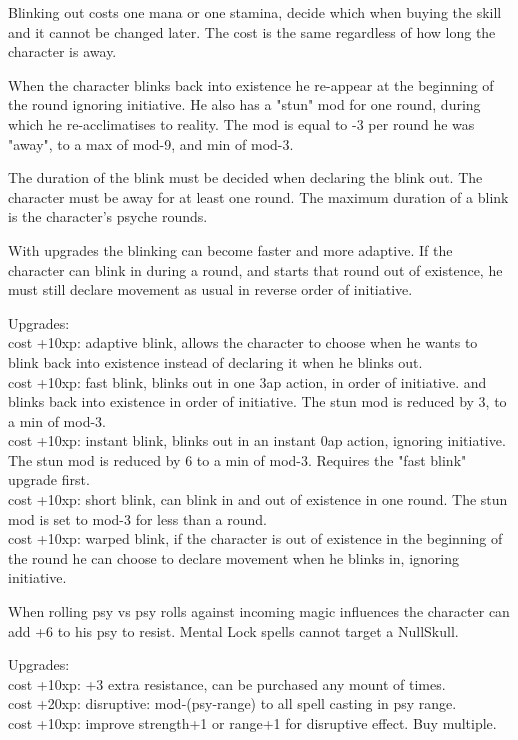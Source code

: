 Blinking out costs one mana or one stamina, decide which when buying the skill and it cannot be changed later. The cost is the same regardless of how long the character is away.

When the character blinks back into existence he re-appear at the beginning of the round ignoring initiative. He also has a "stun" mod for one round, during which he re-acclimatises to reality. The mod is equal to -3 per round he was "away", to a max of mod-9, and min of mod-3.

The duration of the blink must be decided when declaring the blink out.
The character must be away for at least one round. The maximum duration of a blink is the character's psyche rounds.

With upgrades the blinking can become faster and more adaptive. If the character can blink in during a round, and starts that round out of existence, he must still declare movement as usual in reverse order of initiative.

Upgrades: \\
cost +10xp: adaptive blink, allows the character to choose when he wants to blink back into existence instead of declaring it when he blinks out. \\
cost +10xp: fast blink, blinks out in one 3ap action, in order of initiative.
and blinks back into existence in order of initiative. The stun mod is reduced by 3, to a min of mod-3. \\
cost +10xp: instant blink, blinks out in an instant 0ap action, ignoring initiative. The stun mod is reduced by 6 to a min of mod-3. Requires the "fast blink" upgrade first. \\
cost +10xp: short blink, can blink in and out of existence in one round. The stun mod is set to mod-3 for less than a round. \\
cost +10xp: warped blink, if the character is out of existence in the beginning of the round he can choose to declare movement when he blinks in, ignoring initiative.


 When rolling psy vs psy rolls against incoming magic influences the character can add +6 to his psy to resist. Mental Lock spells cannot target a NullSkull.

Upgrades:\\
cost +10xp: +3 extra resistance, can be purchased any mount of times.\\
cost +20xp: disruptive: mod-(psy-range) to all spell casting in psy range.\\
cost +10xp: improve strength+1 or range+1 for disruptive effect. Buy multiple.


